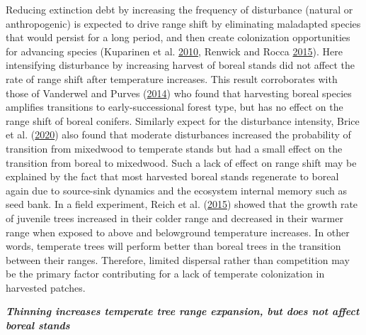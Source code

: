 \documentclass[12pt]{article}
\begin{document}
Reducing extinction debt by increasing the frequency of disturbance
(natural or anthropogenic) is expected to drive range shift by
eliminating maladapted species that would persist for a long period, and
then create colonization opportunities for advancing species (Kuparinen
et al. \protect\hyperlink{ref-Kuparinen2010}{2010}, Renwick and Rocca
\protect\hyperlink{ref-Renwick2015}{2015}). Here intensifying
disturbance by increasing harvest of boreal stands did not affect the
rate of range shift after temperature increases. This result
corroborates with those of Vanderwel and Purves
(\protect\hyperlink{ref-Vanderwel2014}{2014}) who found that harvesting
boreal species amplifies transitions to early-successional forest type,
but has no effect on the range shift of boreal conifers. Similarly
expect for the disturbance intensity, Brice et al.
(\protect\hyperlink{ref-Brice2020}{2020}) also found that moderate
disturbances increased the probability of transition from mixedwood to
temperate stands but had a small effect on the transition from boreal to
mixedwood. Such a lack of effect on range shift may be explained by the
fact that most harvested boreal stands regenerate to boreal again due to
source-sink dynamics and the ecosystem internal memory such as seed
bank. In a field experiment, Reich et al.
(\protect\hyperlink{ref-Reich2015}{2015}) showed that the growth rate of
juvenile trees increased in their colder range and decreased in their
warmer range when exposed to above and belowground temperature
increases. In other words, temperate trees will perform better than
boreal trees in the transition between their ranges. Therefore, limited
dispersal rather than competition may be the primary factor contributing
for a lack of temperate colonization in harvested patches.

\textbf{\emph{Thinning increases temperate tree range expansion, but
does not affect boreal stands}}
\end{document}

